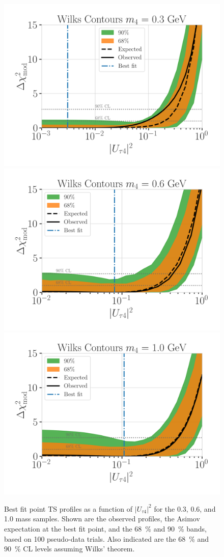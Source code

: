 \begin{figure}[h]
    \includegraphics[width=0.32\linewidth]{figures/results/best_fit/brazil_band_with_asimov_0.3_GeV_updated_with_bfp_with_1sigma.png}
    \includegraphics[width=0.32\linewidth]{figures/results/best_fit/brazil_band_with_asimov_0.6_GeV_updated_with_bfp_with_1sigma.png}
    \includegraphics[width=0.32\linewidth]{figures/results/best_fit/brazil_band_with_asimov_1.0_GeV_updated_with_bfp_with_1sigma.png}
	\caption[Best fit point TS profiles]{Best fit point TS profiles as a function of $|U_{\tau4}|^2$ for the \SI{0.3}{\gev}, \SI{0.6}{\gev}, and \SI{1.0}{\gev} mass samples. Shown are the observed profiles, the Asimov expectation at the best fit point, and the \SI{68}{\percent} and \SI{90}{\percent} bands, based on 100 pseudo-data trials. Also indicated are the \SI{68}{\percent} and \SI{90}{\percent} CL levels assuming Wilks' theorem.}
\end{figure}





